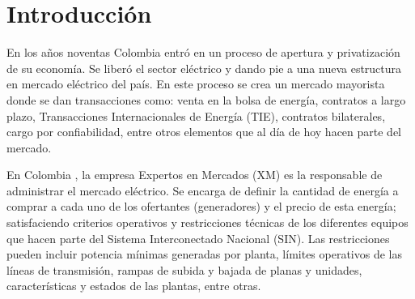 \chapter{Introducción}\label{ch:introinfo}

En los años noventas Colombia entró en un proceso de apertura y privatización de su economía. Se liberó el sector eléctrico y dando pie a una nueva estructura en   mercado eléctrico del país. En este proceso se crea un mercado mayorista donde se dan transacciones como: venta en la bolsa de energía, contratos a largo plazo, Transacciones Internacionales de Energía (TIE), contratos bilaterales, cargo por confiabilidad, entre otros elementos que al día de hoy hacen parte del mercado.

\noindent En Colombia \cite{rodas_gallego_evaluacion_2016}, la empresa Expertos en Mercados (XM) es la responsable de administrar el mercado eléctrico. Se encarga de definir la cantidad de energía a comprar a cada uno de los ofertantes (generadores) y el precio de esta energía; satisfaciendo criterios operativos y restricciones técnicas de los diferentes equipos que hacen parte del Sistema Interconectado Nacional (SIN). Las restricciones pueden incluir potencia mínimas generadas por planta, límites operativos de las líneas de transmisión, rampas de subida y bajada de planas y unidades, características y estados de las plantas,  entre otras. \cite{userCutsCristian}